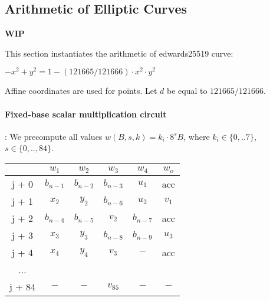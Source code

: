 \subsection{Arithmetic of Elliptic Curves} \label{ellcurve}
\textbf{WIP}

This section instantiates the arithmetic of edwards25519 curve:
\begin{center}
$- x^2 + y^2 = 1 - (121665/121666) \cdot x^2 \cdot y^2$
\end{center}
Affine coordinates are used for points. 
Let $d$ be equal to $121665/121666$.

\paragraph{Fixed-base scalar multiplication circuit}:
We precompute all values $w(B,s,k) = k_i \cdot 8^s B$, where $k_i \in \{ 0,..7 \}$, $s \in \{0,.., 84\}$.
\begin{center}
\begin{tabular}{ c|c|c|c|c|c } 
  & $w_1$ & $w_2$ & $w_3$ & $w_4$ & $w_o$\\ 
 \hline
j + 0 & $b_{n - 1}$ & $b_{n - 2}$ & $b_{n - 3}$ & $u_1$ & acc\\ 
j + 1 & $x_2$ & $y_2$ & $b_{n - 6}$ & $u_2$ & $v_1$\\ 
j + 2 & $b_{n - 4}$ & $b_{n - 5}$ & $v_2$ & $b_{n - 7}$ & acc\\ 
j + 3 & $x_3$ & $ y_3$ & $b_{n - 8}$ & $b_{n - 9}$ & $u_3$\\ 
j + 4 & $x_4$ & $y_4$ & $v_3$ & $-$ & acc\\ 
... & & & & &\\ 
j + 84 & $-$ & $-$ & $v_{85}$ & $-$ & $-$ \\ 
\end{tabular}
\end{center}

